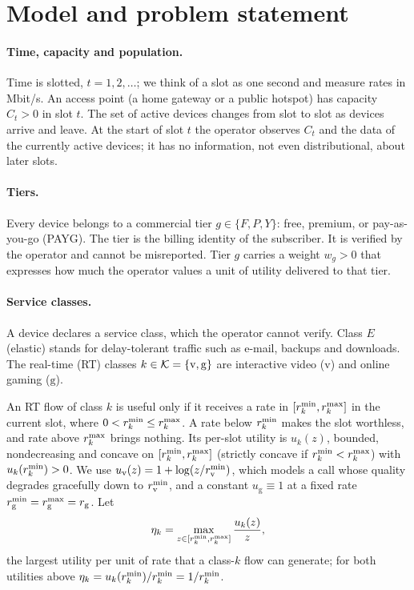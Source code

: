 \section{Model and problem statement}\label{sec:model}

\paragraph{Time, capacity and population.}
Time is slotted, $t=1,2,\dots$; we think of a slot as one second and measure rates in Mbit/s.
An access point (a home gateway or a public hotspot) has capacity $C_t>0$ in slot $t$.
The set of active devices changes from slot to slot as devices arrive and leave.
At the start of slot $t$ the operator observes $C_t$ and the data of the currently active devices; it has no information, not even distributional, about later slots.

\paragraph{Tiers.}
Every device belongs to a commercial tier $g\in\{F,P,Y\}$: free, premium, or pay-as-you-go (PAYG).
The tier is the billing identity of the subscriber. It is verified by the operator and cannot be misreported.
Tier $g$ carries a weight $w_g>0$ that expresses how much the operator values a unit of utility delivered to that tier.

\paragraph{Service classes.}
A device declares a service class, which the operator cannot verify.
Class $E$ (elastic) stands for delay-tolerant traffic such as e-mail, backups and downloads.
The real-time (RT) classes $k\in\mathcal{K}=\{\mathrm{v},\mathrm{g}\}$ are interactive video ($\mathrm{v}$) and online gaming ($\mathrm{g}$).

An RT flow of class $k$ is useful only if it receives a rate in $[r^{\min}_k,r^{\max}_k]$ in the current slot, where $0<r^{\min}_k\le r^{\max}_k$.
A rate below $r^{\min}_k$ makes the slot worthless, and rate above $r^{\max}_k$ brings nothing.
Its per-slot utility is $u_k(z)$, bounded, nondecreasing and concave on $[r^{\min}_k,r^{\max}_k]$ (strictly concave if $r^{\min}_k<r^{\max}_k$) with $u_k(r^{\min}_k)>0$.
We use $u_{\mathrm{v}}(z)=1+\log(z/r^{\min}_{\mathrm{v}})$, which models a call whose quality degrades gracefully down to $r^{\min}_{\mathrm{v}}$, and a constant $u_{\mathrm{g}}\equiv 1$ at a fixed rate $r^{\min}_{\mathrm{g}}=r^{\max}_{\mathrm{g}}=r_{\mathrm{g}}$.
Let
\begin{equation}\label{eq:eta}
\eta_k=\max_{z\in[r^{\min}_k,r^{\max}_k]}\frac{u_k(z)}{z},
\end{equation}
the largest utility per unit of rate that a class-$k$ flow can generate; for both utilities above $\eta_k=u_k(r^{\min}_k)/r^{\min}_k=1/r^{\min}_k$.

